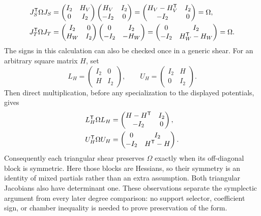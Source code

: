 \documentclass[11pt]{article}
\theoremstyle{definition}
\theoremstyle{remark}
\begin{document}
\begin{align*}
J_S^{\mathsf{T}}\Omega J_S
&=\begin{pmatrix}I_2&H_V\\0&I_2\end{pmatrix}
  \begin{pmatrix}H_V&I_2\\-I_2&0\end{pmatrix}
=\begin{pmatrix}H_V-H_V^{\mathsf{T}}&I_2\\-I_2&0\end{pmatrix}
=\Omega,\\
J_T^{\mathsf{T}}\Omega J_T
&=\begin{pmatrix}I_2&0\\H_W&I_2\end{pmatrix}
  \begin{pmatrix}0&I_2\\-I_2&-H_W\end{pmatrix}
=\begin{pmatrix}0&I_2\\-I_2&H_W^{\mathsf{T}}-H_W\end{pmatrix}
=\Omega.
\end{align*}
The signs in this calculation can also be checked once in a generic shear.
For an arbitrary square matrix \(H\), set
\[
L_H=\begin{pmatrix}I_2&0\\H&I_2\end{pmatrix},
\qquad
U_H=\begin{pmatrix}I_2&H\\0&I_2\end{pmatrix}.
\]
Then direct multiplication, before any specialization to the displayed
potentials, gives
\begin{align*}
L_H^{\mathsf{T}}\Omega L_H
&=\begin{pmatrix}H-H^{\mathsf{T}}&I_2\\-I_2&0\end{pmatrix},\\
U_H^{\mathsf{T}}\Omega U_H
&=\begin{pmatrix}0&I_2\\-I_2&H^{\mathsf{T}}-H\end{pmatrix}.
\end{align*}
Consequently each triangular shear preserves \(\Omega\) exactly when its
off-diagonal block is symmetric.  Here those blocks are Hessians, so their
symmetry is an identity of mixed partials rather than an extra assumption.
Both triangular Jacobians also have determinant one.  These observations
separate the symplectic argument from every later degree comparison: no
support selector, coefficient sign, or chamber inequality is needed to
prove preservation of the form.
\end{document}
